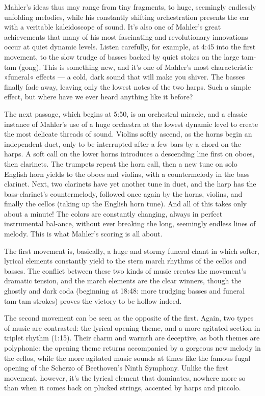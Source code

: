 \documentclass[12pt]{article}%
\begin{document}
Mahler's ideas thus may range from tiny fragments, to huge, seemingly endlessly unfolding melodies, while his constantly shifting orchestration presents the ear with a veritable kaleidoscope of sound. It's also one of Mahler's great achievements that many of his most fascinating and revolutionary innovations occur at quiet dynamic levels. Listen carefully, for example, at 4:45 into the first movement, to the slow trudge of basses backed by quiet stokes on the large tam-tam (gong). This is something new, and it's one of Mahler's most characteristic »funeral« effects --- a cold, dark sound that will make you shiver. The basses finally fade away, leaving only the lowest notes of the two harps. Such a simple effect, but where have we ever heard anything like it before?

The next passage, which begins at 5:50, is an orchestral miracle, and a classic instance of Mahler's use of a huge orchestra at the lowest dynamic level to create the most delicate threads of sound. Violins softly ascend, as the horns begin an independent duet, only to be interrupted after a few bars by a chord on the harps. A soft call on the lower horns introduces a descending line first on oboes, then clarinets.
The trumpets repeat the horn call, then a new tune on solo English horn yields to the oboes and violins, with a countermelody in the bass clarinet. Next, two clarinets have yet another tune in duet, and the harp has the bass-clarinet's countermelody, followed once again by the horns, violins, and finally the cellos (taking up the English horn tune). And all of this takes only about a minute! The colors are constantly changing, always in perfect instrumental bal-ance, without ever breaking the long, seemingly endless lines of melody. This is what Mahler's scoring is all about.

The first movement is, basically, a huge and stormy funeral chant in which softer, lyrical elements constantly yield to the stern march rhythms of the cellos and basses. The conflict between these two kinds of music creates the movement's dramatic tension, and the march elements are the clear winners, though the ghostly and dark coda (beginning at 18:48: more trudging basses and funeral tam-tam strokes) proves the victory to be hollow indeed.

The second movement can be seen as the opposite of the first. Again, two types of music are contrasted: the lyrical opening theme, and a more agitated section in triplet rhythm (1:15).
Their charm and warmth are deceptive, as both themes are polyphonic: the opening theme returns accompanied by a gorgeous new melody in the cellos, while the more agitated music sounds at times like the famous fugal opening of the Scherzo of Beethoven's Ninth Symphony. Unlike the first movement, however, it's the lyrical element that dominates, nowhere more so than when it comes back on plucked strings, accented by harps and piccolo.
\end{document}
